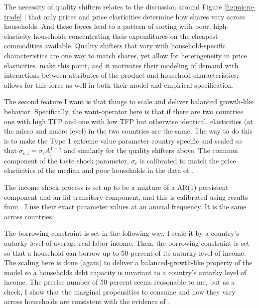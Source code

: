 \documentclass[12pt,pdftex]{article}
\begin{document}
\begin{onehalfspacing}
The necessity of quality shifters relates to the discussion around Figure \ref{fig:micro-trade} | that only prices and price elasticities determine how shares vary across households. And these forces lead to a pattern of sorting with poor, high-elasticity households concentrating their expenditures on the cheapest commodities available. Quality shifters that vary with household-specific characteristics are one way to match shares, yet allow for heterogeneity in price elasticities. \citet{berry1995automobile} make this point, and it motivates their modeling of demand with interactions between attributes of the product and household characteristics; \citet{auer2022unequal} allows for this force as well in both their model and empirical specification.

The second feature I want is that things to scale and deliver balanced growth-like behavior. Specifically, the want-operator here is that if there are two countries one with high TFP and one with low TFP but otherwise identical, elasticities (at the micro and macro level) in the two countries are the same. The way to do this is to make the Type 1 extreme value parameter country specific and scaled so that $\sigma_{\epsilon,i} = \sigma_{\epsilon} A_i^{1-\gamma}$ and similarly for the quality shifters above. The common component of the taste shock parameter, $\sigma_{\epsilon}$ is calibrated to match the price elasticities of the median and poor households in the data of \citet{auer2022unequal}.

The income shock process is set up to be a mixture of a AR(1) persistent component and an iid transitory component, and this is calibrated using results from \citet{krueger2016macroeconomics}. I use their exact parameter values at an annual frequency. It is the same across countries.

The borrowing constraint is set in the following way. I scale it by a country's autarky level of average real labor income. Then, the borrowing constraint is set so that a household can borrow up to 50 percent of its autarky level of income. The scaling here is done (again) to deliver a balanced-growth-like property of the model so a households debt capacity is invariant to a country's autarky level of income. The precise number of 50 percent seems reasonable to me, but as a check, I show that the marginal propensities to consume and how they vary across households are consistent with the evidence of \citet{kaplan2022marginal}.


\end{onehalfspacing}
\end{document}
